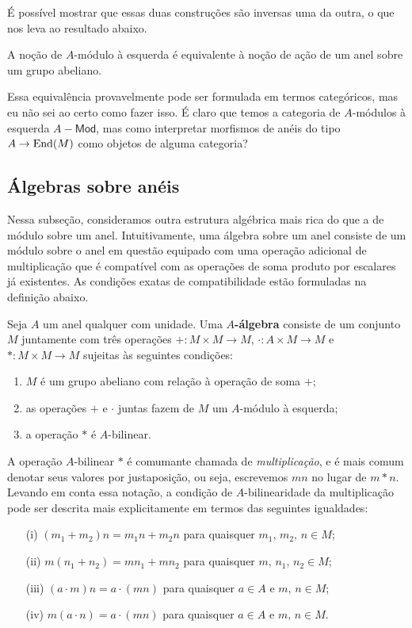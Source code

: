É possível mostrar que essas duas construções são inversas uma da outra, o que nos leva ao resultado abaixo.

\begin{teo}
  A noção de $A$-módulo à esquerda é equivalente à noção de ação de um anel sobre um grupo abeliano.
\end{teo}

Essa equivalência provavelmente pode ser formulada em termos categóricos, mas eu não sei ao certo como fazer isso.
É claro que temos a categoria de $A$-módulos à esquerda $A-\mathsf{Mod}$, mas como interpretar morfismos de anéis do tipo $A \to \mathrm{End}(M)$ como objetos de alguma categoria?

\subsection{Álgebras sobre anéis}

Nessa subseção, consideramos outra estrutura algébrica mais rica do que a de módulo sobre um anel.
Intuitivamente, uma álgebra sobre um anel consiste de um módulo sobre o anel em questão equipado com uma operação adicional de multiplicação que é compatível com as operações de soma produto por escalares já existentes.
As condições exatas de compatibilidade estão formuladas na definição abaixo.

\begin{defin}
  Seja $A$ um anel qualquer com unidade.
  Uma \textbf{$A$-álgebra} consiste de um conjunto $M$ juntamente com três operações $+: M \times M \to M$, $\cdot: A \times M \to M$ e $*: M \times M \to M$ sujeitas às seguintes condições:
  \begin{enumerate}
  \item $M$ é um grupo abeliano com relação à operação de soma $+$;
    
  \item as operações $+$ e $\cdot$ juntas fazem de $M$ um $A$-módulo à esquerda;
    
  \item a operação $*$ é $A$-bilinear.
  \end{enumerate}
\end{defin}

A operação $A$-bilinear $*$ é comumante chamada de \emph{multiplicação}, e é mais comum denotar seus valores por justaposição, ou seja, escrevemos $mn$ no lugar de $m*n$.
Levando em conta essa notação, a condição de $A$-bilinearidade da multiplicação pode ser descrita mais explicitamente em termos das seguintes igualdades:
\begin{enumerate}
\item[(i)] $(m_1+m_2)n = m_1n+m_2n$ para quaisquer $m_1,\,m_2,\, n \in M$;
  
\item[(ii)] $m(n_1+n_2) = mn_1 + mn_2$ para quaisquer $m,\,n_1,\,n_2 \in M$;
  
\item[(iii)] $(a \cdot m)n = a \cdot(mn)$ para quaisquer $a \in A$ e $m,\,n \in M$;
  
\item[(iv)] $m(a \cdot n) = a \cdot (mn)$ para quaisquer $a \in A$ e $m,\, n \in M$.
\end{enumerate}

